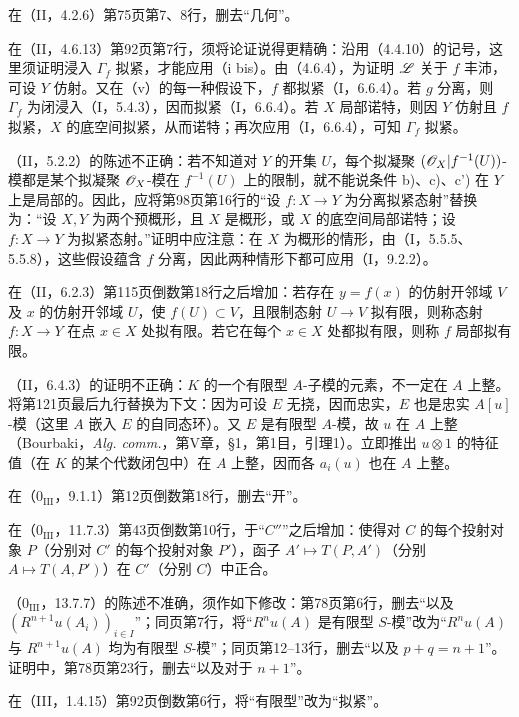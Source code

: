 在（II，4.2.6）第75页第7、8行，删去“几何”。

在（II，4.6.13）第92页第7行，须将论证说得更精确：沿用（4.4.10）的记号，这里须证明浸入 $\Gamma_f$ 拟紧，才能应用（i bis）。由（4.6.4），为证明 $\mathscr L$ 关于 $f$ 丰沛，可设 $Y$ 仿射。又在（v）的每一种假设下，$f$ 都拟紧（I，6.6.4）。若 $g$ 分离，则 $\Gamma_f$ 为闭浸入（I，5.4.3），因而拟紧（I，6.6.4）。若 $X$ 局部诺特，则因 $Y$ 仿射且 $f$ 拟紧，$X$ 的底空间拟紧，从而诺特；再次应用（I，6.6.4），可知 $\Gamma_f$ 拟紧。

（II，5.2.2）的陈述不正确：若不知道对 $Y$ 的开集 $U$，每个拟凝聚 $(\mathscr O_X|f^{-1}(U))$-模都是某个拟凝聚 $\mathscr O_X$-模在 $f^{-1}(U)$ 上的限制，就不能说条件 b)、c)、c') 在 $Y$ 上是局部的。因此，应将第98页第16行的“设 $f:X\to Y$ 为分离拟紧态射”替换为：“设 $X,Y$ 为两个预概形，且 $X$ 是概形，或 $X$ 的底空间局部诺特；设 $f:X\to Y$ 为拟紧态射。”证明中应注意：在 $X$ 为概形的情形，由（I，5.5.5、5.5.8），这些假设蕴含 $f$ 分离，因此两种情形下都可应用（I，9.2.2）。

在（II，6.2.3）第115页倒数第18行之后增加：若存在 $y=f(x)$ 的仿射开邻域 $V$ 及 $x$ 的仿射开邻域 $U$，使 $f(U)\subset V$，且限制态射 $U\to V$ 拟有限，则称态射 $f:X\to Y$ 在点 $x\in X$ 处拟有限。若它在每个 $x\in X$ 处都拟有限，则称 $f$ 局部拟有限。

（II，6.4.3）的证明不正确：$K$ 的一个有限型 $A$-子模的元素，不一定在 $A$ 上整。将第121页最后九行替换为下文：因为可设 $E$ 无挠，因而忠实，$E$ 也是忠实 $A[u]$-模（这里 $A$ 嵌入 $E$ 的自同态环）。又 $E$ 是有限型 $A$-模，故 $u$ 在 $A$ 上整（Bourbaki，\textit{Alg. comm.}，第V章，§1，第1目，引理1）。立即推出 $u\otimes1$ 的特征值（在 $K$ 的某个代数闭包中）在 $A$ 上整，因而各 $a_i(u)$ 也在 $A$ 上整。

在（$0_{\mathrm{III}}$，9.1.1）第12页倒数第18行，删去“开”。

在（$0_{\mathrm{III}}$，11.7.3）第43页倒数第10行，于“$C''$”之后增加：使得对 $C$ 的每个投射对象 $P$（分别对 $C'$ 的每个投射对象 $P'$），函子 $A'\mapsto T(P,A')$（分别 $A\mapsto T(A,P')$）在 $C'$（分别 $C$）中正合。

（$0_{\mathrm{III}}$，13.7.7）的陈述不准确，须作如下修改：第78页第6行，删去“以及 $(R^{n+1}u(A_i))_{i\in I}$”；同页第7行，将“$R^nu(A)$ 是有限型 $S$-模”改为“$R^nu(A)$ 与 $R^{n+1}u(A)$ 均为有限型 $S$-模”；同页第12--13行，删去“以及 $p+q=n+1$”。证明中，第78页第23行，删去“以及对于 $n+1$”。

在（III，1.4.15）第92页倒数第6行，将“有限型”改为“拟紧”。

